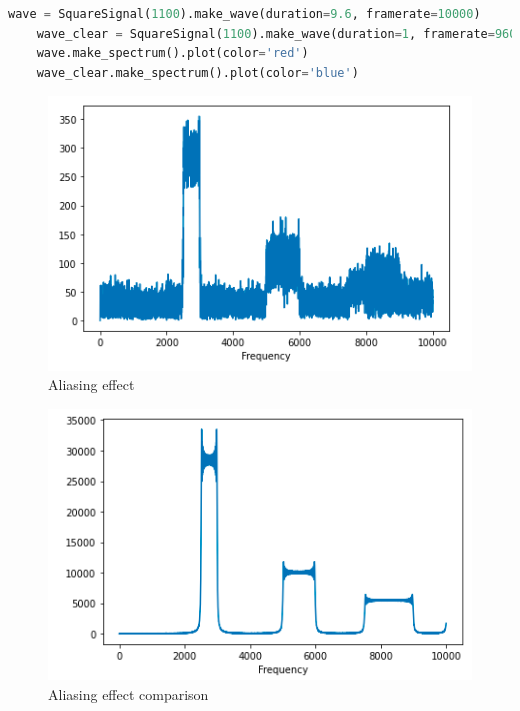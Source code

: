 \documentclass[a4paper]{article}
\begin{document}
        
            
        \begin{lstlisting}[language=Python,caption=Waves creation,label={lst:als_sqr}]
    wave = SquareSignal(1100).make_wave(duration=9.6, framerate=10000)
    wave_clear = SquareSignal(1100).make_wave(duration=1, framerate=96000)
    wave.make_spectrum().plot(color='red')
    wave_clear.make_spectrum().plot(color='blue')
        \end{lstlisting}
            
        \begin{figure}[H]
            \centering
            \includegraphics[width=\textwidth]{img/saw_noisy.png}
            \caption{Aliasing effect}
            \label{fig:als_sqr}
        \end{figure}
        
        \begin{figure}[H]
            \centering
            \includegraphics[width=\textwidth]{img/saw_clr.png}
            \caption{Aliasing effect comparison}
            \label{fig:als_clr}
        \end{figure}
            
\end{document}
